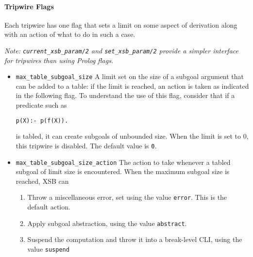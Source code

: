 \begin{description}

%
\paragraph*{Tripwire Flags}
Each tripwire has one flag that sets a limit on some aspect of
derivation along with an action of what to do in such a case.

{\em Note: {\tt current\_xsb\_param/2} and {\tt set\_xsb\_param/2}
provide a simpler interface for tripwires than using Prolog flags.}

\begin{itemize}

\item {\tt max\_table\_subgoal\_size} A limit set on the size of a
  subgoal argument that can be added to a table: if the limit is
  reached, an action is taken as indicated in the following flag.  To
  understand the use of this flag, consider that if a predicate such
  as
\begin{verbatim}
p(X):- p(f(X)).
\end{verbatim}
  is tabled, it can create subgoals of unbounded size.  
  When the limit is set to 0, this tripwire is disabled.  The
  default value is {\tt 0}.

\item {\tt max\_table\_subgoal\_size\_action} The action to take
  whenever a tabled subgoal of limit size is encountered.  When the
  maximum subgoal size is reached, XSB can
\begin{enumerate}
\item Throw a miscellaneous error, set using the value {\tt error}.
  This is the default action.
%
\item Apply subgoal abstraction, using the value {\tt abstract}.
%
\item Suspend the computation and throw it into a break-level CLI,
  using the value {\tt suspend}
%
%
\end{enumerate}


\end{itemize}
\end{description}
